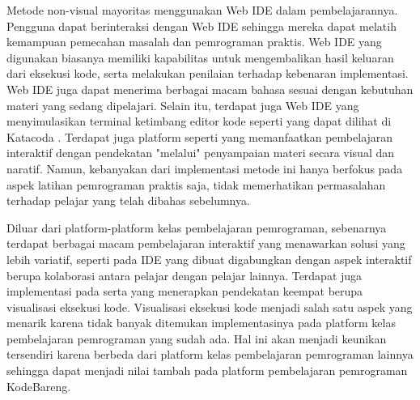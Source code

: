 Metode non-visual mayoritas menggunakan Web IDE dalam pembelajarannya. Pengguna dapat berinteraksi dengan Web IDE sehingga mereka dapat melatih kemampuan pemecahan masalah dan pemrograman praktis. Web IDE yang digunakan biasanya memiliki kapabilitas untuk mengembalikan hasil keluaran dari eksekusi kode, serta melakukan penilaian terhadap kebenaran implementasi. Web IDE juga dapat menerima berbagai macam bahasa sesuai dengan kebutuhan materi yang sedang dipelajari. Selain itu, terdapat juga Web IDE yang menyimulasikan terminal ketimbang editor kode seperti yang dapat dilihat di Katacoda \parencite{katacoda2021media}. Terdapat juga platform seperti \textcite{progate2021media} yang memanfaatkan pembelajaran interaktif dengan pendekatan "melalui" penyampaian materi secara visual dan naratif. Namun, kebanyakan dari implementasi metode ini hanya berfokus pada aspek latihan pemrograman praktis saja, tidak memerhatikan permasalahan terhadap pelajar yang telah dibahas sebelumnya.

Diluar dari platform-platform kelas pembelajaran pemrograman, sebenarnya terdapat berbagai macam pembelajaran interaktif yang menawarkan solusi yang lebih variatif, seperti pada \textcite{tran2013interactive} IDE yang dibuat digabungkan dengan aspek interaktif berupa kolaborasi antara pelajar dengan pelajar lainnya. Terdapat juga implementasi pada \textcite{guo2013pythontutor} serta \textcite{moons2013pilot} yang menerapkan pendekatan keempat berupa visualisasi eksekusi kode. Visualisasi eksekusi kode menjadi salah satu aspek yang menarik karena tidak banyak ditemukan implementasinya pada platform kelas pembelajaran pemrograman yang sudah ada. Hal ini akan menjadi keunikan tersendiri karena berbeda dari platform kelas pembelajaran pemrograman lainnya sehingga dapat menjadi nilai tambah pada platform pembelajaran pemrograman KodeBareng.



